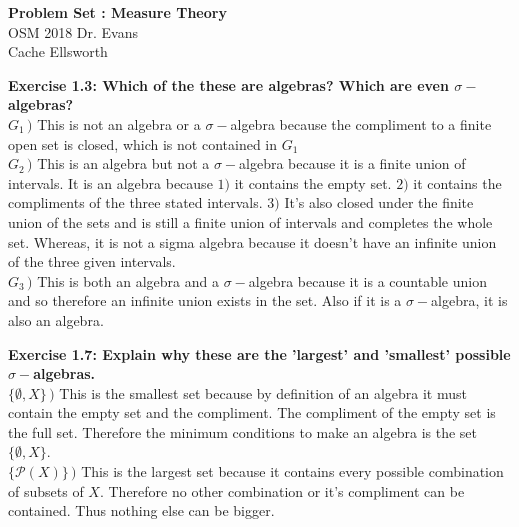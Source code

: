 \documentclass[letterpaper,12pt]{article}
\theoremstyle{definition}
\begin{document}
\begin{flushleft}
  \textbf{\large{Problem Set : Measure Theory}} \\
  OSM 2018 Dr. Evans \\
  Cache Ellsworth
  \end{flushleft}

\vspace{5mm}

\noindent\textbf{Exercise 1.3:
Which of the these are algebras?  Which are even $\sigma-$algebras?}\\
\indent\textbf{$ G_1 \,)$ }This is not an algebra or a $\sigma-$algebra because the compliment to a finite open set is closed, which is not contained in $G_1$ \\
\indent\textbf{$G_2 \,)$ } This is an algebra but not a $\sigma-$algebra because it is a finite union of intervals. It is an algebra because $1)$ it contains the empty set. $2)$ it contains the compliments of the three stated intervals.  $3)$ It's also closed under the finite union of the sets and is still a finite union of intervals and completes the whole set. Whereas, it is not a sigma algebra because it doesn't have an infinite union of the three given intervals. \\
\indent\textbf{$G_3 \,)$ } This is both an algebra and a $\sigma-$algebra because it is a countable union and so therefore an infinite union exists in the set.  Also if it is a $\sigma-$algebra, it is also an algebra. \\

\vspace{5mm}

\noindent\textbf{Exercise 1.7:
Explain why these are the 'largest' and 'smallest' possible $\sigma-$algebras.}\\
\indent\textbf{$\{\emptyset, X\}\,)$} This is the smallest set because by definition of an algebra it must contain the empty set and the compliment.  The compliment of the empty set is the full set.  Therefore the minimum conditions to make an algebra is the set $\{\emptyset, X\}$.\\
\indent \textbf{$\{\mathcal{P}(X)\}\,)$} This is the largest set because it contains every possible combination of subsets of $X$.  Therefore no other combination or it's compliment can be contained. Thus nothing else can be bigger.\\

\vspace{5mm}
\end{document}
